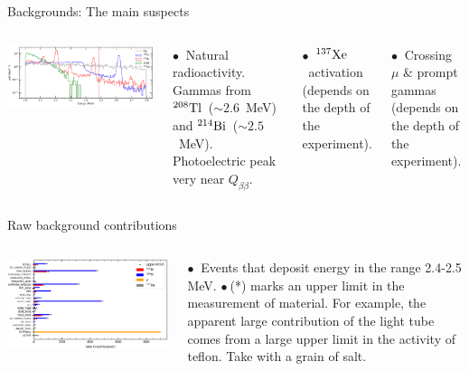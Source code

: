 \documentclass [aspectratio=169]{beamer}
\newcommand{\qbb}{\ensuremath{Q_{\beta\beta}}}
\newcommand{\XES}{\ensuremath{{}^{137}{\rm Xe}}}
\newcommand{\TL}{\ensuremath{{}^{208}{\rm Tl}}}
\newcommand{\BI}{\ensuremath{{}^{214}{\rm Bi}}}
\begin{document}
\begin{frame}{Backgrounds: The main suspects}
\begin{columns}
\includegraphics[scale=0.50]{bkgndSpectrum.png}

$\bullet~$ Natural radioactivity. Gammas from \TL\ ($\sim 2.6$~MeV) and \BI\ ($\sim 2.5$~MeV). Photoelectric peak very near \qbb. 

$\bullet~$ \XES\ activation (depends on the depth of the experiment). 

$\bullet~$ Crossing $\mu$ \& prompt gammas  (depends on the depth of the experiment). 

 \end{columns}
\end{frame}

\begin{frame}{Raw background contributions}
\begin{columns}
\includegraphics[scale=0.50]{rawBkgnd.png}

$\bullet~$ Events that deposit energy in the range 2.4-2.5 MeV. 
$\bullet~$(*) marks an upper limit in the measurement of material. For example, the apparent large contribution of the light tube comes from a large upper limit in the activity of teflon. Take with a grain of salt. 

 \end{columns}
\end{frame}
\end{document}
